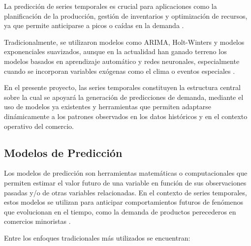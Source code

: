 La predicción de series temporales es crucial para aplicaciones como la planificación de la producción, gestión de inventarios y optimización de recursos, ya que permite anticiparse a picos o caídas en la demanda \parencite{hyndman2018}.

Tradicionalmente, se utilizaron modelos como ARIMA, Holt-Winters y modelos exponenciales suavizados, aunque en la actualidad han ganado terreno los modelos basados en aprendizaje automático y redes neuronales, especialmente cuando se incorporan variables exógenas como el clima o eventos especiales \parencite{bandara2020}.

En el presente proyecto, las series temporales constituyen la estructura central sobre la cual se apoyará la generación de predicciones de demanda, mediante el uso de modelos ya existentes y herramientas que permiten adaptarse dinámicamente a los patrones observados en los datos históricos y en el contexto operativo del comercio.

\subsection{Modelos de Predicción}

Los modelos de predicción son herramientas matemáticas o computacionales que permiten estimar el valor futuro de una variable en función de sus observaciones pasadas y/o de otras variables relacionadas. En el contexto de series temporales, estos modelos se utilizan para anticipar comportamientos futuros de fenómenos que evolucionan en el tiempo, como la demanda de productos perecederos en comercios minoristas \parencite{hyndman2018}.

Entre los enfoques tradicionales más utilizados se encuentran:

